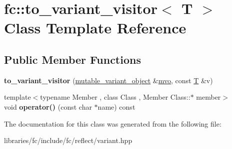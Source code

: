 \hypertarget{classfc_1_1to__variant__visitor}{}\section{fc\+:\+:to\+\_\+variant\+\_\+visitor$<$ T $>$ Class Template Reference}
\label{classfc_1_1to__variant__visitor}
\subsection*{Public Member Functions}
\begin{DoxyCompactItemize}
\item 
\mbox{\label{classfc_1_1to__variant__visitor_a83fec1d53afbc6c8ff1f2ceb0799a510}} 
{\bfseries to\+\_\+variant\+\_\+visitor} (\mbox{\hyperlink{classfc_1_1mutable__variant__object}{mutable\+\_\+variant\+\_\+object}} \&\mbox{\hyperlink{classfc_1_1mutable__variant__object}{mvo}}, const \mbox{\hyperlink{struct_t}{T}} \&v)
\item 
\mbox{\label{classfc_1_1to__variant__visitor_a059d120f54abf982bb2deb6845100df3}} 
{\footnotesize template$<$typename Member , class Class , Member Class\+::$\ast$ member$>$ }\\void {\bfseries operator()} (const char $\ast$name) const
\end{DoxyCompactItemize}


The documentation for this class was generated from the following file\+:\begin{DoxyCompactItemize}
\item 
libraries/fc/include/fc/reflect/variant.\+hpp\end{DoxyCompactItemize}
